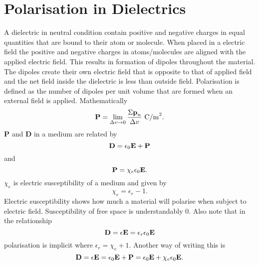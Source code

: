 \documentclass[12pt,a4paper]{article}
\begin{document}
\section{Polarisation in Dielectrics}
A dielectric in neutral condition contain positive and negative charges in equal quantities that are bound to their atom or molecule. When placed in a electric field the positive and negative charges in atoms/molecules are aligned with the applied electric field. This results in formation of dipoles throughout the material. The dipoles create their own electric field that is opposite to that of applied field and the net field inside the dielectric is less than outside field. Polarisation is defined as the number of dipoles per unit volume that are formed when an external field is applied. Mathematically
\begin{equation}
\mathrm{\textbf P}=\lim_{\Delta v \to 0}\dfrac{\Sigma\mathrm{\textbf p}_n}{\Delta v}~\mathrm{C/m}^2.
\end{equation}
\textbf{P} and \textbf{D} in a medium are related by
\begin{equation}
\mathrm{\textbf D}=\epsilon_0\mathrm{\textbf E}+\mathrm{\textbf P}
\end{equation}
and
\begin{equation}
\mathrm{\textbf P}=\chi_e\epsilon_0\mathrm{\textbf E}.
\end{equation}
$\chi_e$ is electric susceptibility of a medium and given by
\begin{equation}
\chi_e=\epsilon_r-1.
\end{equation}
Electric susceptibility shows how much a material will polarise when subject to electric field. Susceptibility of free space is understandably 0. Also note that in the relationship
\begin{equation}
\mathrm{\textbf D}=\epsilon\mathrm{\textbf E}=\epsilon_r\epsilon_0\mathrm{\textbf E}
\end{equation}
polarisation is implicit where $\epsilon_r=\chi_e+1$. Another way of writing this is
\begin{equation}
\mathrm{\textbf D}=\epsilon\mathrm{\textbf E}=\epsilon_0\mathrm{\textbf E}+\mathrm{\textbf P}=\epsilon_0\mathrm{\textbf E}+\chi_e\epsilon_0\mathrm{\textbf E}.
\end{equation}
%
%
\end{document}
